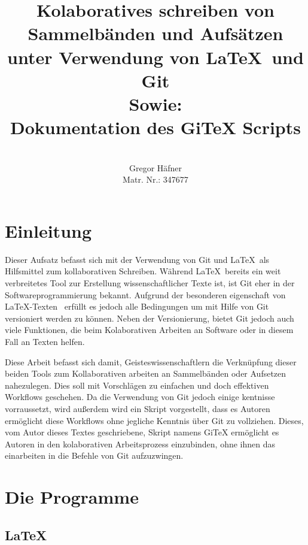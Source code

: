 \documentclass[12pt,a4paper]{scrartcl}
\author{\\ Gregor Häfner \\
{\small Matr. Nr.: 347677} }
\title{Kolaboratives schreiben von Sammelbänden und Aufsätzen unter Verwendung von \LaTeX ~und Git \bigskip \\ Sowie: \\ Dokumentation des GiTeX Scripts}
\begin{document}
\maketitle
\bigskip
\tableofcontents
\pagebreak

\section{Einleitung}

Dieser Aufsatz befasst sich mit der Verwendung von Git und \LaTeX \ als Hilfsmittel zum kollaborativen Schreiben. Während \LaTeX \ bereits ein weit verbreitetes Tool zur Erstellung wissenschaftlicher Texte ist, ist Git eher in der Softwareprogrammierung bekannt. Aufgrund der besonderen eigenschaft von \LaTeX -Texten \ erfüllt es jedoch alle Bedingungen um mit Hilfe von Git versioniert werden zu können. Neben der Versionierung, bietet Git jedoch auch viele Funktionen, die beim Kolaborativen Arbeiten an Software oder in diesem Fall an Texten helfen.

 Diese Arbeit befasst sich damit, Geisteswissenschaftlern die Verknüpfung dieser beiden Tools zum Kollaborativen arbeiten an Sammelbänden oder Aufsetzen nahezulegen. Dies soll mit Vorschlägen zu einfachen und doch effektiven Workflows geschehen. Da die Verwendung von Git jedoch einige kentnisse vorraussetzt, wird außerdem wird ein Skript vorgestellt, dass es Autoren ermöglicht diese Workflows ohne jegliche Kenntnis über Git zu vollziehen. Dieses, vom Autor dieses Textes geschriebene, Skript namens GiTeX ermöglicht es Autoren in den kolaborativen Arbeitsprozess einzubinden, ohne ihnen das einarbeiten in die Befehle von Git aufzuzwingen.

\section{Die Programme}

\subsection{\LaTeX}
\end{document}
